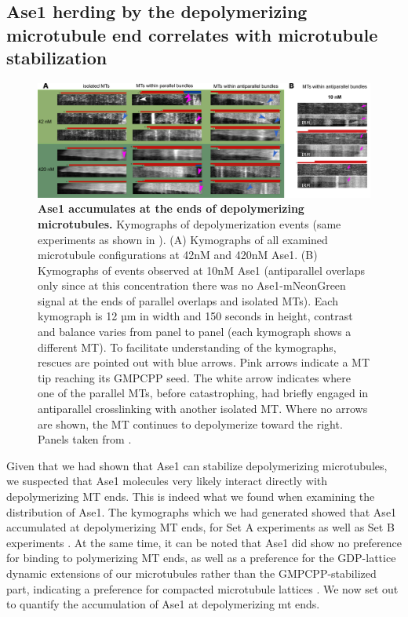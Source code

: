 \subsection{Ase1 herding by the depolymerizing microtubule end correlates with microtubule stabilization}
\label{sec:ase12}
\begin{figure}[h]
    \centering
    \includegraphics[width=1\linewidth]{Figures/ase2a.png}
    \caption[Ase1 accumulates at the ends of depolymerizing microtubules.]{\textbf{Ase1 accumulates at the ends of depolymerizing microtubules.} Kymographs of depolymerization events (same experiments as shown in ). (A) Kymographs of all examined microtubule configurations at 42nM and 420nM Ase1. (B) Kymographs of events observed at 10nM Ase1 (antiparallel overlaps only since at this concentration there was no Ase1-mNeonGreen signal at the ends of parallel overlaps and isolated MTs). Each kymograph is 12 µm in width and 150 seconds in height, contrast and balance varies from panel to panel (each kymograph shows a different MT). To facilitate understanding of the kymographs, rescues are pointed out with blue arrows. Pink arrows indicate a MT tip reaching its GMPCPP seed. The white arrow indicates where one of the parallel MTs, before catastrophing, had briefly engaged in antiparallel crosslinking with another isolated MT. Where no arrows are shown, the MT continues to depolymerize toward the right. Panels taken from \cite{Krattenmacher2024}.
        }\label{ase2a}
\end{figure}
Given that we had shown that Ase1 can stabilize depolymerizing microtubules, we suspected that Ase1 molecules very likely interact directly with depolymerizing MT ends. This is indeed what we found when examining the distribution of Ase1. The kymographs which we had generated showed that Ase1 accumulated at depolymerizing MT ends, for Set A experiments  as well as Set B experiments . At the same time, it can be noted that Ase1 did show no preference for binding to polymerizing MT ends, as well as a preference for the GDP-lattice dynamic extensions of our microtubules rather than the GMPCPP-stabilized part, indicating a preference for compacted microtubule lattices . We now set out to quantify the accumulation of Ase1 at depolymerizing mt ends. \par
